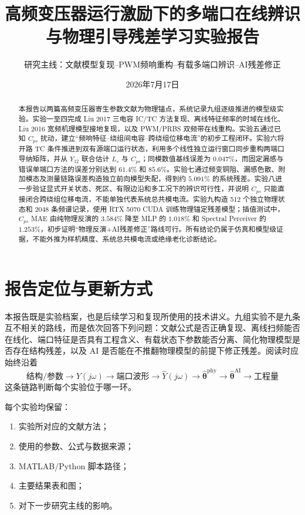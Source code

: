 \documentclass[UTF8,a4paper,12pt]{ctexart}
\title{\textbf{高频变压器运行激励下的多端口在线辨识与物理引导残差学习实验报告}}
\author{研究主线：文献模型复现--PWM频响重构--有载多端口辨识--AI残差修正}
\date{2026年7月17日}
\begin{document}
\maketitle

\begin{abstract}
本报告以两篇高频变压器寄生参数文献为物理锚点，系统记录九组逐级推进的模型级实验。实验一至四完成 Liu 2017 三电容 IC/TC 方法复现、离线特征频率的时域在线化、Liu 2016 宽频机理模型接地复现，以及 PWM/PRBS 双频带在线重构。实验五通过已知 $C_{ps}$ 扰动，建立“频响特征--绕组间电容--跨绕组位移电流”的初步工程闭环。实验六将开路 TC 条件推进到双有源端口运行状态，利用多个线性独立运行窗口同步重构两端口导纳矩阵，并从 $Y_{12}$ 联合估计 $L_s$ 与 $C_{ps}$；同模数值基线误差为 $0.047\%$，而固定漏感与错误单端口方法的误差分别达到 $61.4\%$ 和 $85.6\%$。实验七通过频变铜阻、漏感色散、附加模态及测量链路误差构造独立前向模型失配，得到约 $5.091\%$ 的系统残差。实验八进一步验证显式开关状态、死区、有限边沿和多工况下的辨识可行性，并说明 $C_{ps}$ 只能直接闭合跨绕组位移电流，不能单独代表系统总共模电流。实验九构造 512 个独立物理状态和 2048 条频谱记录，使用 RTX 5070 CUDA 训练物理锚定残差模型；插值测试中，$C_{ps}$ MAE 由纯物理反演的 $3.584\%$ 降至 MLP 的 $1.018\%$ 和 Spectral Perceiver 的 $1.253\%$，初步证明“物理反演+AI残差修正”路线可行。所有结论仍属于仿真和模型级证据，不能外推为样机精度、系统总共模电流或绝缘老化诊断结论。
\end{abstract}

\tableofcontents
\newpage

\section{报告定位与更新方式}

本报告既是实验档案，也是后续学习和复现所使用的技术讲义。九组实验不是九条互不相关的路线，而是依次回答下列问题：文献公式是否正确复现、离线扫频能否在线化、端口特征是否具有工程含义、有载状态下参数能否分离、简化物理模型是否存在结构残差，以及 AI 是否能在不推翻物理模型的前提下修正残差。阅读时应始终沿着
\begin{equation}
\text{结构/参数}\rightarrow Y(j\omega)\rightarrow
\text{端口波形}\rightarrow\hat Y(j\omega)
\rightarrow\hat{\boldsymbol\theta}^{\mathrm{phy}}
\rightarrow\hat{\boldsymbol\theta}^{\mathrm{AI}}
\rightarrow\text{工程量}
\end{equation}
这条链路判断每个实验位于哪一环。

每个实验均保留：

\begin{enumerate}
  \item 实验所对应的文献方法；
  \item 使用的参数、公式与数据来源；
  \item MATLAB/Python 脚本路径；
  \item 主要结果表和图；
  \item 对下一步研究主线的影响。
\end{enumerate}
\end{document}

